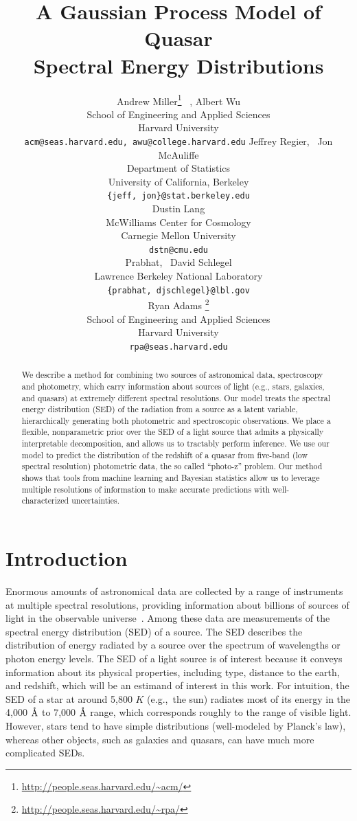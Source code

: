 \documentclass{article} %
\title{A Gaussian Process Model of Quasar \\ Spectral Energy Distributions}
\author{
Andrew Miller\thanks{\url{http://people.seas.harvard.edu/\~acm/}} \, ,  Albert Wu \\
School of Engineering and Applied Sciences\\
Harvard University\\
\texttt{acm@seas.harvard.edu, awu@college.harvard.edu}
\And
Jeffrey Regier, \, Jon McAuliffe \\
Department of Statistics \\
University of California, Berkeley \\
\texttt{\{jeff, jon\}@stat.berkeley.edu} \\
\And
Dustin Lang \\
McWilliams Center for Cosmology \\
Carnegie Mellon University \\
\texttt{dstn@cmu.edu} \\
\And
Prabhat, \, David Schlegel \\
Lawrence Berkeley National Laboratory \\
\texttt{\{prabhat, djschlegel\}@lbl.gov} \\
\And
Ryan Adams \thanks{\url{http://people.seas.harvard.edu/\~rpa/}}\\
School of Engineering and Applied Sciences\\
Harvard University\\
\texttt{rpa@seas.harvard.edu} \\
}
\begin{document}
\maketitle

\begin{abstract} 
We describe a method for combining two sources of astronomical data, spectroscopy and photometry, which carry information about sources of light (e.g., stars, galaxies, and quasars) at extremely different spectral resolutions. 
Our model treats the spectral energy distribution (SED) of the radiation from a source as a latent variable, hierarchically generating both photometric and spectroscopic observations.  
We place a flexible, nonparametric prior over the SED of a light source that admits a physically interpretable decomposition, and allows us to tractably perform inference.  
We use our model to predict the distribution of the redshift of a quasar from five-band (low spectral resolution) photometric data, the so called ``photo-z'' problem. 
Our method shows that tools from machine learning and Bayesian statistics allow us to leverage multiple resolutions of information to make accurate predictions with well-characterized uncertainties. 
\end{abstract} 

\section{Introduction}
Enormous amounts of astronomical data are collected by a range of instruments at multiple spectral resolutions, providing information about billions of sources of light in the observable universe~\cite{alam2015eleventh, martin2005galex}.  
Among these data are measurements of the spectral energy distribution (SED) of a source.  
The SED describes the distribution of energy radiated by a source over the spectrum of wavelengths or photon energy levels.
The SED of a light source is of interest because it conveys information about its physical properties, including type, distance to the earth, and redshift, which will be an estimand of interest in this work. 
For intuition, the SED of a star at around 5,800 $K$ (e.g.,~the sun) radiates most of its energy in the 4,000 $\textup{\AA}$ to 7,000 $\textup{\AA}$ range, which corresponds roughly to the range of visible light.  
However, stars tend to have simple distributions (well-modeled by Planck's law), whereas other objects, such as galaxies and quasars, can have much more complicated SEDs.  
\end{document}
